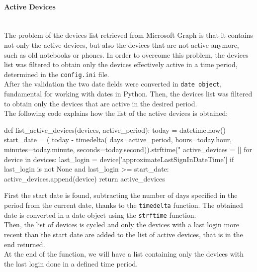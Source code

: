 \documentclass[12pt, a4paper, oneside]{article}
\begin{document}
\paragraph{Active Devices} ~\\
The problem of the devices list retrieved from Microsoft Graph is that it contains not only the active devices, but also the devices that are not active anymore, such as old notebooks or phones.
In order to overcome this problem, the devices list was filtered to obtain only the devices effectively active in a time period, determined in the \texttt{config.ini} file.\\
After the validation the two date fields were converted in \texttt{date object}, fundamental for working with dates in Python. Then, the devices list was filtered to obtain only the devices that are active 
in the desired period.\\
The following code explains how the list of the active devices is obtained:
\begin{python}
def list_active_devices(devices, active_period):
   today = datetime.now()
   start_date = (
      today -
      timedelta(
         days=active_period,
         hours=today.hour,
         minutes=today.minute,
         seconds=today.second)).strftime("%
   active_devices = []
   for device in devices:
       last_login = device['approximateLastSignInDateTime']
       if last_login is not None and last_login >= start_date:
           active_devices.append(device)
   return active_devices
\end{python}
First the start date is found, subtracting the number of days specified in the period from the current date, thanks to the \texttt{timedelta} function. The obtained date is converted in a date object using the
\texttt{strftime} function.\\
Then, the list of devices is cycled and only the devices with a last login more recent than the start date are added to the list of active devices, that is in the end returned.\\
At the end of the function, we will have a list containing only the devices with the last login done in a defined time period.
\end{document}
